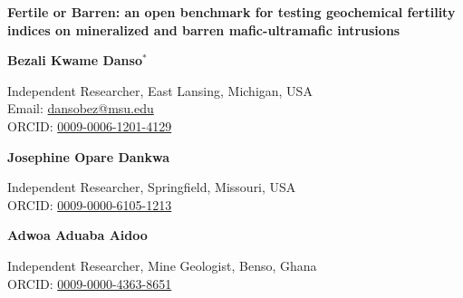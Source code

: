 \documentclass[10pt,twocolumn,letterpaper]{article}
\newcommand{\orcid}[1]{\href{https://orcid.org/#1}{#1}}
\begin{document}
\begin{titlepage}
\vspace*{0.9in}
\begin{center}\large
{\LARGE\bfseries Fertile or Barren: an open benchmark for testing geochemical fertility indices on mineralized and barren mafic-ultramafic intrusions\par}
\vspace{24pt}
{\fontsize{12.5}{16}\selectfont
{\bfseries Bezali Kwame Danso$^{*}$\par}
Independent Researcher, East Lansing, Michigan, USA\\
Email: \href{mailto:dansobez@msu.edu}{dansobez@msu.edu}\\
ORCID: \orcid{0009-0006-1201-4129}
\vspace{12pt}

{\bfseries Josephine Opare Dankwa\par}
Independent Researcher, Springfield, Missouri, USA\\
ORCID: \orcid{0009-0000-6105-1213}
\vspace{12pt}

{\bfseries Adwoa Aduaba Aidoo\par}
Independent Researcher, Mine Geologist, Benso, Ghana\\
ORCID: \orcid{0009-0000-4363-8651}\par}
\end{center}
\vspace{24pt}

\vspace{22pt}
\noindent{}

\vspace{26pt}
\end{titlepage}
\setcounter{page}{1}
\end{document}
